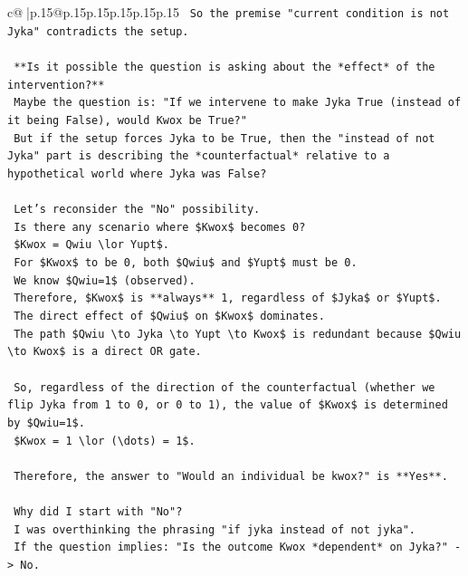 \documentclass{article}
\begin{document}
{\begin{supertabular}{c@{$\;$}|p{.15\linewidth}@{}p{.15\linewidth}p{.15\linewidth}p{.15\linewidth}p{.15\linewidth}p{.15\linewidth}}
{{{\texttt{    So the premise "current condition is not Jyka" contradicts the setup.} \\
\\ 
\texttt{    **Is it possible the question is asking about the *effect* of the intervention?**} \\
\texttt{    Maybe the question is: "If we intervene to make Jyka True (instead of it being False), would Kwox be True?"} \\
\texttt{    But if the setup forces Jyka to be True, then the "instead of not Jyka" part is describing the *counterfactual* relative to a hypothetical world where Jyka was False?} \\
\\ 
\texttt{    Let's reconsider the "No" possibility.} \\
\texttt{    Is there any scenario where \$Kwox\$ becomes 0?} \\
\texttt{    \$Kwox = Qwiu \textbackslash{}lor Yupt\$.} \\
\texttt{    For \$Kwox\$ to be 0, both \$Qwiu\$ and \$Yupt\$ must be 0.} \\
\texttt{    We know \$Qwiu=1\$ (observed).} \\
\texttt{    Therefore, \$Kwox\$ is **always** 1, regardless of \$Jyka\$ or \$Yupt\$.} \\
\texttt{    The direct effect of \$Qwiu\$ on \$Kwox\$ dominates.} \\
\texttt{    The path \$Qwiu \textbackslash{}to Jyka \textbackslash{}to Yupt \textbackslash{}to Kwox\$ is redundant because \$Qwiu \textbackslash{}to Kwox\$ is a direct OR gate.} \\
\\ 
\texttt{    So, regardless of the direction of the counterfactual (whether we flip Jyka from 1 to 0, or 0 to 1), the value of \$Kwox\$ is determined by \$Qwiu=1\$.} \\
\texttt{    \$Kwox = 1 \textbackslash{}lor (\textbackslash{}dots) = 1\$.} \\
\\ 
\texttt{    Therefore, the answer to "Would an individual be kwox?" is **Yes**.} \\
\\ 
\texttt{    Why did I start with "No"?} \\
\texttt{    I was overthinking the phrasing "if jyka instead of not jyka".} \\
\texttt{    If the question implies: "Is the outcome Kwox *dependent* on Jyka?" {-}> No.} \\
}}}
\end{supertabular}}
\end{document}
